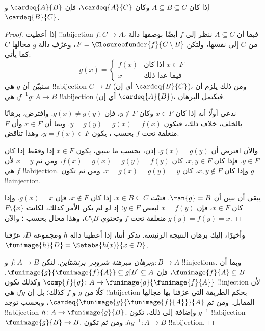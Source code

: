 \documentclass[../../../include/open-logic-section]{subfiles}
\begin{document}
\begin{prop}
إذا كان $A \subseteq B \subseteq C$ وكان $\cardeq{A}{C}$، فإن $\cardeq{A}{B}$ و$\cardeq{B}{C}$.
\end{prop}

\begin{proof}
إذا أعطيت !!a{bijection} $f \colon C \to A$، فبما أن $A\subseteq C$
ننظر إلى $f$ أيضًا بوصفها دالة من $C$ إلى نفسها، ولتكن $F =
\Closureofunder{f}{C \setminus B}$، وعرّف دالة $g$ مجالها $C$ كما
يأتي:
\[
	g(x) =
	\begin{cases}
			f(x) &\text{إذا كان $x \in F$}\\
			x & \text{فيما عدا ذلك}
		\end{cases}
\]
سنبيّن أن $g$ هي !!a{bijection} $C \to B$ (أي إن $\cardeq{B}{C}$)، ومن ذلك يلزم أن
$\comp{f^{-1}}{g} \colon A \to B$ هي !!a{bijection} (أي إن $\cardeq{A}{B}$)، فيكتمل البرهان.

ندعي أولًا أنه إذا كان $x \in F$ وكان $y\notin F$، فإن $g(x) \neq
g(y)$. وافترض، برهانًا بالخلف، خلاف ذلك، فيكون $y = g(y) = g(x) =
f(x)$. وبما أن $x \in F$ وأن $F$ منغلقة تحت $f$ بحسب
، يكون $y = f(x) \in F$، وهذا تناقض.

والآن افترض أن $g(x) = g(y)$. إذن، بحسب ما سبق، يكون $x \in F$ إذا
وفقط إذا كان $y \in F$. فإذا كان $x, y \in F$، كان $f(x) = g (x) =
g(y) = f(y)$، ومن ثم $x = y$ لأن $f$ هي !!a{bijection}. وإذا كان
$x, y \notin F$، كان $x = g(x) = g(y) = y$. ومن ثم تكون $g$
!!a{injection}.

يبقى أن نبين أن $\ran{g} = B$. فثبّت $x \in B \subseteq C$. إذا كان
$x \notin F$، فإن $g(x) = x$. وإذا كان $x \in F$، فإن $x = f(y)$
لبعض $y \in F$؛ إذ لو لم يكن الأمر كذلك، لكانت $F \setminus \{x\}$
منغلقة تحت $f$ وتحتوي $C\setminus B$، وهذا محال بحسب
؛ والآن $g(y) = f(y) = x$.
\end{proof}

وأخيرًا، إليك برهان النتيجة الرئيسة. تذكر أننا، إذا أعطينا دالة $h$
ومجموعة $D$، عرّفنا $\funimage{h}{D} = \Setabs{h(x)}{x
\in D}$.

\begin{proof}[برهان مبرهنة شرودر–برنشتاين] لتكن $f \colon A \to B$
و$g \colon B \to A$ !!{injection}s. وبما أن $\funimage{f}{A}
\subseteq B$، فإن $\funimage{g}{\funimage{f}{A}} \subseteq
g[B] \subseteq A$. وكذلك تكون $\comp{f}{g} \colon A \to
\funimage{g}{\funimage{f}{A}}$ !!{injection} لأن كلًا من $g$ و
$f$ كذلك؛ بل إن $\comp{f}{g}$ هي !!a{bijection} بحكم الطريقة التي
عرّفنا بها مجالها المقابل. ومن ثم
$\cardeq{\funimage{g}{\funimage{f}{A}}}{A}$، وبحسب
 توجد !!a{bijection} $h \colon A \to
\funimage{g}{B}$. وإضافة إلى ذلك، تكون $g^{-1}$ !!a{bijection}
$\funimage{g}{B} \to B$. ومن ثم تكون $\comp{h}{g^{-1}} \colon A \to B$
!!a{bijection}.
\end{proof}
\end{document}

